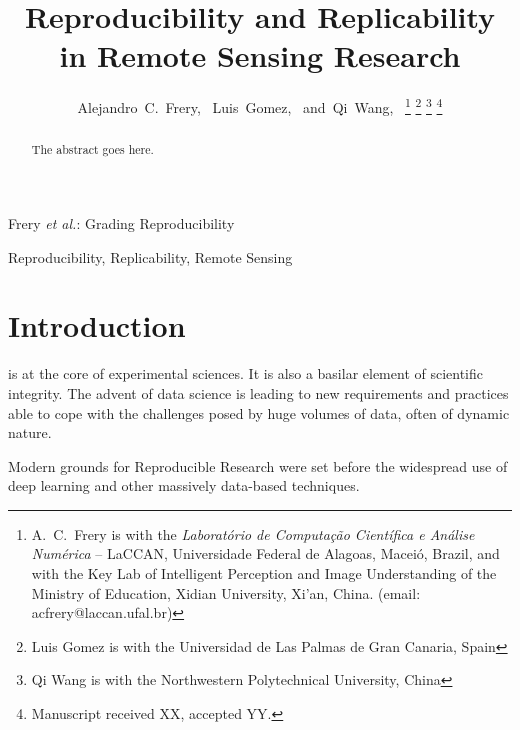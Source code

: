 \documentclass[journal]{IEEEtran}
\begin{document}
	
\title{Reproducibility and Replicability in Remote Sensing Research}
	
\author{Alejandro~C.~Frery,~
Luis~Gomez,~
and~Qi~Wang,~%
\thanks{A.\ C.\ Frery is with the \textit{Laborat\'orio de Computa\c c\~ao Cient\'ifica e An\'alise Num\'erica} -- LaCCAN, Universidade Federal de Alagoas, Macei\'o, Brazil, and with the Key Lab of Intelligent Perception and Image Understanding of the Ministry of Education, Xidian University, Xi'an, China. (email: acfrery@laccan.ufal.br)}%
\thanks{Luis Gomez is with the Universidad de Las Palmas de Gran Canaria, Spain}%
\thanks{Qi Wang is with the Northwestern Polytechnical University, China}%
\thanks{Manuscript received XX, accepted YY.}}
	
%
{Frery \MakeLowercase{\textit{et al.}}: Grading Reproducibility}
	
\maketitle
	
\begin{abstract}
The abstract goes here.
\end{abstract}
	
\begin{IEEEkeywords}
Reproducibility,
Replicability,
Remote Sensing
\end{IEEEkeywords}
	

\IEEEpeerreviewmaketitle

\section{Introduction}\label{Sec:Introduction}
	
 is at the core of experimental sciences. 
It is also a basilar element of scientific integrity. 
The advent of data science is leading to new requirements and practices able to cope with the challenges posed by huge volumes of data, often of dynamic nature. 
	
Modern grounds for Reproducible Research were set before the widespread use of deep learning and other massively data-based techniques. 
	
\end{document}
